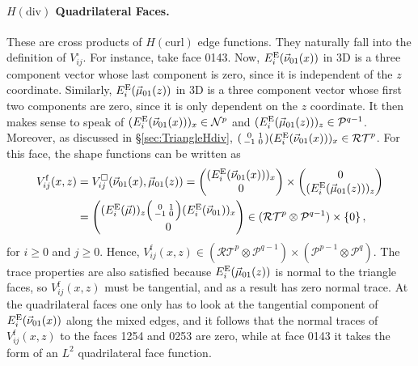 \paragraph{\texorpdfstring{$H(\mathrm{div})$}{Hdiv} Quadrilateral Faces.} 
These are cross products of $H(\mathrm{curl})$ edge functions. 
They naturally fall into the definition of $V_{ij}^\square$.
For instance, take face 0143.
Now, $E_i^{\mathrm{E}}(\vec{\nu}_{01}(x))$ in 3D is a three component vector whose last component is zero, since it is independent of the $z$ coordinate. 
Similarly, $E_i^{\mathrm{E}}(\vec{\mu}_{01}(z))$ in 3D is a three component vector whose first two components are zero, since it is only dependent on the $z$ coordinate.
It then makes sense to speak of $(E_i^{\mathrm{E}}(\vec{\nu}_{01}(x)))_x\in\mathcal{N}^p$ and $(E_i^{\mathrm{E}}(\vec{\mu}_{01}(z)))_z\in\mathcal{P}^{q-1}$. 
Moreover, as discussed in \S\ref{sec:TriangleHdiv}, $(\begin{smallmatrix}0&1\\-1&0\end{smallmatrix})(E_i^{\mathrm{E}}(\vec{\nu}_{01}(x)))_x\in\mathcal{RT}^p$.
For this face, the shape functions can be written as
\begin{equation*}
	\begin{aligned}
	V_{ij}^\mathrm{f}(x,z)&=V_{ij}^\square(\vec{\nu}_{01}(x),\vec{\mu}_{01}(z))
		=\begin{pmatrix}(E_i^{\mathrm{E}}(\vec{\nu}_{01}(x)))_x\\0\end{pmatrix}
		\times \begin{pmatrix}0\\(E_i^{\mathrm{E}}(\vec{\mu}_{01}(z)))_z\end{pmatrix}\\
				&=\begin{pmatrix}(E_i^{\mathrm{E}}(\vec{\mu}))_z
					\Big(\begin{smallmatrix}0&1\\-1&0\end{smallmatrix}\Big)(E_i^{\mathrm{E}}(\vec{\nu}_{01}))_x\\0\end{pmatrix}
					\in(\mathcal{RT}^p\otimes\mathcal{P}^{q-1})\times\{0\}\,,
	\end{aligned}
\end{equation*}
for $i\geq0$ and $j\geq0$. 
Hence, $V_{ij}^\mathrm{f}(x,z)\in(\mathcal{RT}^p\otimes\mathcal{P}^{q-1})\times(\mathcal{P}^{p-1}\otimes\mathcal{P}^q)$.
The trace properties are also satisfied because $E_i^{\mathrm{E}}(\vec{\mu}_{01}(z))$ is normal to the triangle faces, so $V_{ij}^\mathrm{f}(x,z)$ must be tangential, and as a result has zero normal trace.
At the quadrilateral faces one only has to look at the tangential component of $E_i^{\mathrm{E}}(\vec{\nu}_{01}(x))$ along the mixed edges, and it follows that the normal traces of $V_{ij}^\mathrm{f}(x,z)$ to the faces 1254 and 0253 are zero, while at face 0143 it takes the form of an $L^2$ quadrilateral face function.

